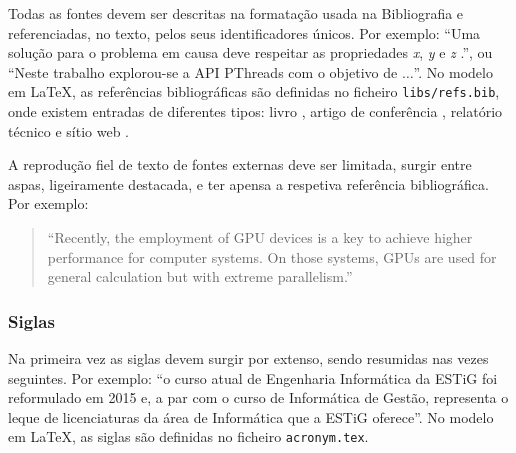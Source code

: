 Todas as fontes devem ser descritas na formatação usada na Bibliografia e referenciadas, no texto, pelos seus identificadores únicos. Por exemplo: ``Uma solução para o problema em causa deve respeitar as propriedades {\it x}, {\it y} e {\it z} \cite{INPROC1}.'', ou ``Neste trabalho explorou-se a API PThreads \cite{TECH01} com o objetivo de $\dots$''.  No modelo em LaTeX, as referências bibliográficas são definidas no ficheiro {\tt libs/refs.bib}, onde existem entradas de diferentes tipos: livro \cite{BOOK01}, artigo de conferência \cite{INPROC1}, relatório técnico \cite{TECH01} e sítio web \cite{FORD11}.

A reprodução fiel de texto de fontes externas deve ser limitada, surgir entre aspas, ligeiramente destacada, e ter apensa a respetiva referência bibliográfica.  Por exemplo:

\begin{quotation}
``Recently, the employment of GPU devices is a key to achieve higher performance for computer systems. On those systems, GPUs are used for general calculation but with extreme parallelism.'' \cite{INPROC1}
\end{quotation}

\subsubsection{Siglas}
Na primeira vez as siglas devem surgir por extenso, sendo resumidas nas vezes seguintes. Por exemplo: ``o curso atual de Engenharia Informática da \gls{ESTiG} foi reformulado em 2015 e, a par com o curso de Informática de Gestão, representa o leque de licenciaturas da área de Informática que a \gls{ESTiG} oferece''. No modelo em LaTeX, as siglas são definidas no ficheiro {\tt acronym.tex}.




